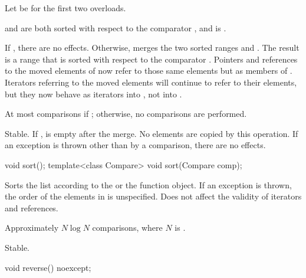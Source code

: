 \begin{itemdescr}
\pnum
Let  be  for the first two overloads.

\pnum
\expects
{} and  are both sorted
with respect to the comparator , and
 is .

\pnum
\effects
If , there are no effects.
Otherwise, merges
the two sorted ranges  and .
The result is a range
that is sorted with respect to the comparator .
Pointers and references to the moved elements of  now refer to those same elements
but as members of . Iterators referring to the moved elements will continue to
refer to their elements, but they now behave as iterators into , not into
.

\pnum
\complexity
At most  comparisons
if ; otherwise, no comparisons are performed.

\pnum
\remarks
Stable.
If ,  is empty after the merge.
No elements are copied by this operation.
If an exception is thrown other than by a comparison, there are no effects.
\end{itemdescr}

%
\begin{itemdecl}
void sort();
template<class Compare> void sort(Compare comp);
\end{itemdecl}

\begin{itemdescr}
\pnum
\effects
Sorts the list according to the  or the  function object.
If an exception is thrown, the order of the elements in  is unspecified.
Does not affect the validity of iterators and references.

\pnum
\complexity
Approximately $N \log N$ comparisons, where $N$ is .

\pnum
\remarks
Stable.
\end{itemdescr}

%
\begin{itemdecl}
void reverse() noexcept;
\end{itemdecl}

